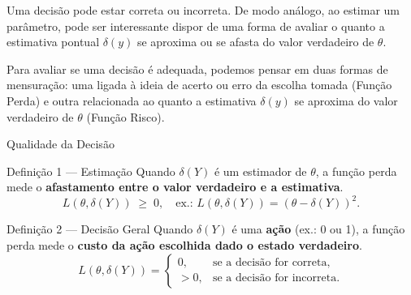 \documentclass[12pt]{beamer}
\begin{document}
\begin{frame}{}
	\begin{block}{}
		\justifying
	Uma decisão pode estar correta ou incorreta. De modo análogo, ao estimar um parâmetro, pode ser interessante dispor de uma forma de avaliar o quanto a estimativa pontual $\delta(y)$ se aproxima ou se afasta do valor verdadeiro de $\theta$.
	\end{block}
	\pause
	\begin{block}{}
	Para avaliar se uma decisão é adequada, podemos pensar em duas formas de mensuração: uma ligada à ideia de acerto ou erro da escolha tomada (Função Perda) e outra relacionada ao quanto a estimativa $\delta(y)$ se aproxima do valor verdadeiro de $\theta$ (Função Risco).
	\end{block}
\end{frame}

\begin{frame}{Qualidade da Decisão} 

\begin{block}{Definição 1 — Estimação}
	Quando $\delta(Y)$ é um estimador de $\theta$, 
	a função perda mede o \textbf{afastamento entre o valor verdadeiro e a estimativa}.
	\[
	L(\theta,\delta(Y)) \;\geq\; 0, \quad
	\text{ex.: } L(\theta,\delta(Y))=(\theta-\delta(Y))^2.
	\]
\end{block}

\begin{block}{Definição 2 — Decisão Geral}
	Quando $\delta(Y)$ é uma \textbf{ação} (ex.: 0 ou 1), 
	a função perda mede o \textbf{custo da ação escolhida dado o estado verdadeiro}.
	\[
	L(\theta,\delta(Y)) =
	\begin{cases}
		0, & \text{se a decisão for correta}, \\
		>0, & \text{se a decisão for incorreta}.
	\end{cases}
	\]
\end{block}
\end{frame}
\end{document}
